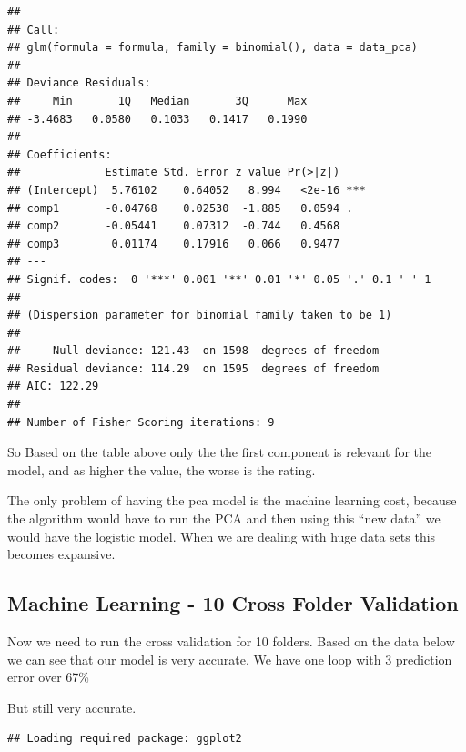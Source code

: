 \documentclass[]{article}
\begin{document}
\begin{verbatim}
## 
## Call:
## glm(formula = formula, family = binomial(), data = data_pca)
## 
## Deviance Residuals: 
##     Min       1Q   Median       3Q      Max  
## -3.4683   0.0580   0.1033   0.1417   0.1990  
## 
## Coefficients:
##             Estimate Std. Error z value Pr(>|z|)    
## (Intercept)  5.76102    0.64052   8.994   <2e-16 ***
## comp1       -0.04768    0.02530  -1.885   0.0594 .  
## comp2       -0.05441    0.07312  -0.744   0.4568    
## comp3        0.01174    0.17916   0.066   0.9477    
## ---
## Signif. codes:  0 '***' 0.001 '**' 0.01 '*' 0.05 '.' 0.1 ' ' 1
## 
## (Dispersion parameter for binomial family taken to be 1)
## 
##     Null deviance: 121.43  on 1598  degrees of freedom
## Residual deviance: 114.29  on 1595  degrees of freedom
## AIC: 122.29
## 
## Number of Fisher Scoring iterations: 9
\end{verbatim}

So Based on the table above only the the first component is relevant for
the model, and as higher the value, the worse is the rating.

The only problem of having the pca model is the machine learning cost,
because the algorithm would have to run the PCA and then using this
``new data'' we would have the logistic model. When we are dealing with
huge data sets this becomes expansive.

\subsection{Machine Learning - 10 Cross Folder
Validation}\label{machine-learning---10-cross-folder-validation}

Now we need to run the cross validation for 10 folders. Based on the
data below we can see that our model is very accurate. We have one loop
with 3 prediction error over 67\%

But still very accurate.

\begin{verbatim}
## Loading required package: ggplot2
\end{verbatim}
\end{document}
